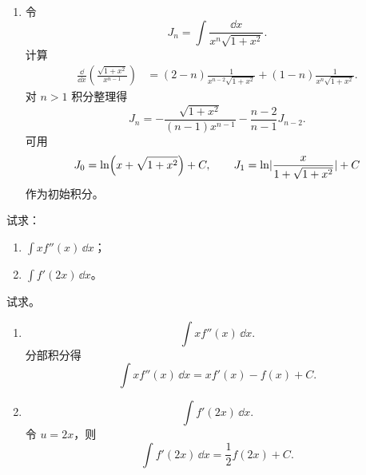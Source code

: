 \begin{xsolution}
\begin{enumerate}[label=(\arabic*)]
    \item 令
    \[
      J_n=\int\frac{\dd x}{x^n\sqrt{1+x^2}}.
    \]
    计算
    \begin{align*}
      \frac{\dd}{\dd x}\left(\frac{\sqrt{1+x^2}}{x^{n-1}}\right)
      &=(2-n)\frac1{x^{n-2}\sqrt{1+x^2}}
       +(1-n)\frac1{x^n\sqrt{1+x^2}}.
    \end{align*}
    对 $n>1$ 积分整理得
    \[
      \boxed{J_n
      =-\frac{\sqrt{1+x^2}}{(n-1)x^{n-1}}
       -\frac{n-2}{n-1}J_{n-2}}.
    \]
    可用
    \[
      J_0=\ln(x+\sqrt{1+x^2})+C,
      \qquad
      J_1=\ln\lvert\frac{x}{1+\sqrt{1+x^2}}\rvert+C
    \]
    作为初始积分。
  \end{enumerate}
\end{xsolution}


\begin{xexercise}[5]
试求：
  \begin{enumerate}[label=(\arabic*)]
    \item $\displaystyle\int x f''(x)\,\dd x$；
    \item $\displaystyle\int f'(2x)\,\dd x$。
  \end{enumerate}
\end{xexercise}
\begin{xsolution}
试求。
  \begin{enumerate}[label=(\arabic*)]
    \item
    \[
      \int x f''(x)\,\dd x.
    \]
    分部积分得
    \[
      \boxed{\int x f''(x)\,\dd x=x f'(x)-f(x)+C}.
    \]

    \item
    \[
      \int f'(2x)\,\dd x.
    \]
    令 $u=2x$，则
    \[
      \boxed{\int f'(2x)\,\dd x=\frac12f(2x)+C}.
    \]
  \end{enumerate}
\end{xsolution}



